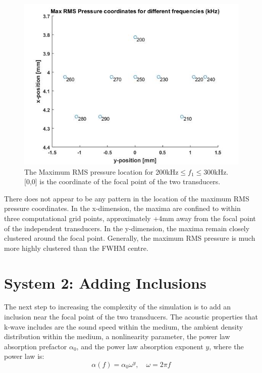 \documentclass[10pt,a4paper]{article}
\begin{document}
\begin{figure}[H] \label{RMS_Max}
\centering
\includegraphics[scale=0.65]{Max_RMS_pressure_coords}
\caption{The Maximum RMS pressure location for 200kHz$\leq f_1 \leq$300kHz.  [0,0] is the coordinate of the focal point of the two transducers. } 
\end{figure}

There does not appear to be any pattern in the location of the maximum RMS pressure coordinates. In the x-dimension, the maxima are confined to within three computational grid points, approximately +4mm away from the focal point of the independent transducers. In the y-dimension, the maxima remain closely clustered around the focal point. Generally, the maximum RMS pressure is much more highly clustered than the FWHM centre.

\section*{System 2: Adding Inclusions}

The next step to increasing the complexity of the simulation is to add an inclusion near the focal point of the two transducers. The acoustic properties that k-wave includes are the sound speed within the medium, the ambient density distribution within the medium, a nonlinearity parameter, the power law absorption prefactor $\alpha_0$, and the power law absorption exponent $y$, where the power law is:
\begin{equation}
\alpha(f) = \alpha_0 \omega^y, 	\quad \omega = 2 \pi f 
\end{equation}
\end{document}
